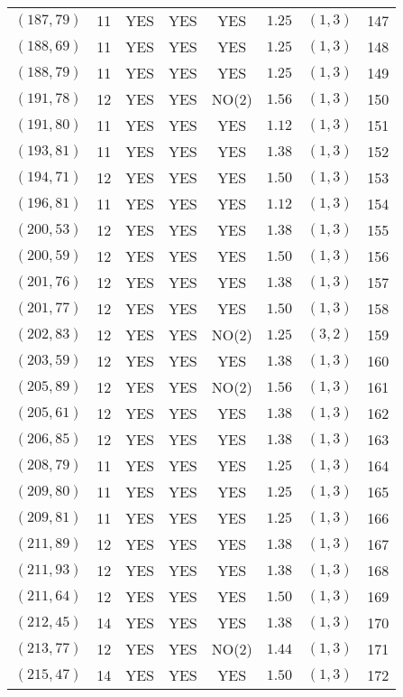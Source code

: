 \begin{longtable}{|c|c|c|c|c|c|c|c|}
$(187,79)$ & 11 & YES & YES & YES & $1.25$ & $(1,3)$ & 147\\
$(188,69)$ & 11 & YES & YES & YES & $1.25$ & $(1,3)$ & 148\\
$(188,79)$ & 11 & YES & YES & YES & $1.25$ & $(1,3)$ & 149\\
$(191,78)$ & 12 & YES & YES & NO(2) & $1.56$ & $(1,3)$ & 150\\
$(191,80)$ & 11 & YES & YES & YES & $1.12$ & $(1,3)$ & 151\\
$(193,81)$ & 11 & YES & YES & YES & $1.38$ & $(1,3)$ & 152\\
$(194,71)$ & 12 & YES & YES & YES & $1.50$ & $(1,3)$ & 153\\
$(196,81)$ & 11 & YES & YES & YES & $1.12$ & $(1,3)$ & 154\\
$(200,53)$ & 12 & YES & YES & YES & $1.38$ & $(1,3)$ & 155\\
$(200,59)$ & 12 & YES & YES & YES & $1.50$ & $(1,3)$ & 156\\
$(201,76)$ & 12 & YES & YES & YES & $1.38$ & $(1,3)$ & 157\\
$(201,77)$ & 12 & YES & YES & YES & $1.50$ & $(1,3)$ & 158\\
$(202,83)$ & 12 & YES & YES & NO(2) & $1.25$ & $(3,2)$ & 159\\
$(203,59)$ & 12 & YES & YES & YES & $1.38$ & $(1,3)$ & 160\\
$(205,89)$ & 12 & YES & YES & NO(2) & $1.56$ & $(1,3)$ & 161\\
$(205,61)$ & 12 & YES & YES & YES & $1.38$ & $(1,3)$ & 162\\
$(206,85)$ & 12 & YES & YES & YES & $1.38$ & $(1,3)$ & 163\\
$(208,79)$ & 11 & YES & YES & YES & $1.25$ & $(1,3)$ & 164\\
$(209,80)$ & 11 & YES & YES & YES & $1.25$ & $(1,3)$ & 165\\
$(209,81)$ & 11 & YES & YES & YES & $1.25$ & $(1,3)$ & 166\\
$(211,89)$ & 12 & YES & YES & YES & $1.38$ & $(1,3)$ & 167\\
$(211,93)$ & 12 & YES & YES & YES & $1.38$ & $(1,3)$ & 168\\
$(211,64)$ & 12 & YES & YES & YES & $1.50$ & $(1,3)$ & 169\\
$(212,45)$ & 14 & YES & YES & YES & $1.38$ & $(1,3)$ & 170\\
$(213,77)$ & 12 & YES & YES & NO(2) & $1.44$ & $(1,3)$ & 171\\
$(215,47)$ & 14 & YES & YES & YES & $1.50$ & $(1,3)$ & 172\\

\end{longtable}
